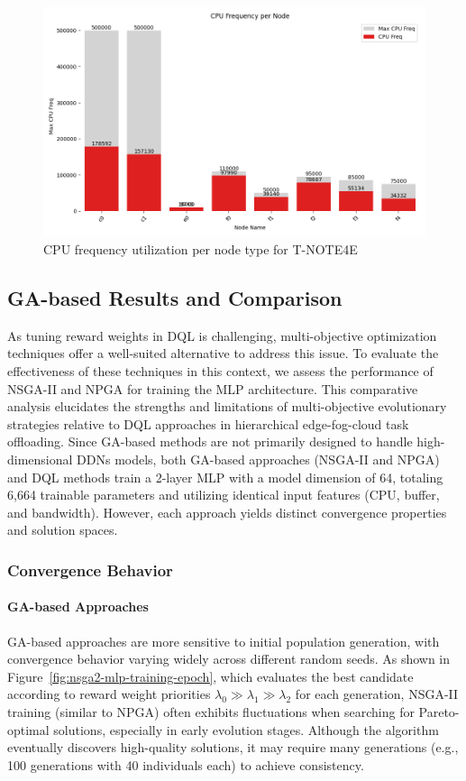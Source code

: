 \documentclass[preprint,3p,authoryear]{elsarticle}
\begin{document}
\begin{figure}[H]
    \centering
    \includegraphics[width=0.5\linewidth]{figs/T-NOTE4E/cpu_frequency_per_node.png}
    \caption{CPU frequency utilization per node type for T-NOTE4E}
    \label{fig:T-NOTE4E-cpu-frequency}
\end{figure}

\subsection{GA-based Results and Comparison}\label{subsec:ga_vs_DQL}

As tuning reward weights in DQL is challenging, multi-objective optimization techniques offer a well-suited alternative to address this issue. To evaluate the effectiveness of these techniques in this context, we assess the performance of NSGA-II and NPGA for training the MLP architecture. This comparative analysis elucidates the strengths and limitations of multi-objective evolutionary strategies relative to DQL approaches in hierarchical edge-fog-cloud task offloading. Since GA-based methods are not primarily designed to handle high-dimensional DDNs models, both GA-based approaches (NSGA-II and NPGA) and DQL methods train a 2-layer MLP with a model dimension of 64, totaling 6,664 trainable parameters and utilizing identical input features (CPU, buffer, and bandwidth). However, each approach yields distinct convergence properties and solution spaces.

\subsubsection{Convergence Behavior}

\paragraph{GA-based Approaches}
GA-based approaches are more sensitive to initial population generation, with convergence behavior varying widely across different random seeds. As shown in Figure~\ref{fig:nsga2-mlp-training-epoch}, which evaluates the best candidate according to reward weight priorities \(\lambda_0 \gg \lambda_1 \gg \lambda_2\) for each generation, NSGA-II training (similar to NPGA) often exhibits fluctuations when searching for Pareto-optimal solutions, especially in early evolution stages. Although the algorithm eventually discovers high-quality solutions, it may require many generations (e.g., 100 generations with 40 individuals each) to achieve consistency.
\end{document}
